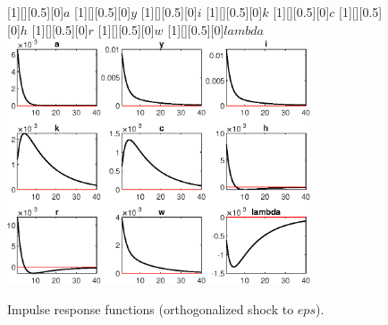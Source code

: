  
\begin{figure}[H]
[1][][0.5][0]{$a$}
[1][][0.5][0]{$y$}
[1][][0.5][0]{$i$}
[1][][0.5][0]{$k$}
[1][][0.5][0]{$c$}
[1][][0.5][0]{$h$}
[1][][0.5][0]{$r$}
[1][][0.5][0]{$w$}
[1][][0.5][0]{$lambda$}
\centering 
\includegraphics[width=0.80\textwidth]{SLMR_IRF_eps}
\caption{Impulse response functions (orthogonalized shock to $eps$).}
\label{Fig:IRF:eps}
\end{figure}
 
 
